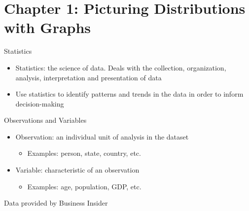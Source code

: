 \documentclass{beamer}
\begin{document}
\section{Chapter 1: Picturing Distributions with Graphs}

\begin{frame}{Statistics}
    \begin{itemize}
        \item \alert{Statistics}: the science of data. Deals with the collection, organization, analysis, interpretation and presentation of data
        \item Use statistics to identify patterns and trends in the data in order to inform decision-making
    \end{itemize}
\end{frame}

\begin{frame}{Observations and Variables}
    \begin{itemize}
        \item \alert{Observation}: an individual unit of analysis in the dataset
        \begin{itemize}
            \item Examples: person, state, country, etc.
        \end{itemize}
        
        \item \alert{Variable}: characteristic of an observation
        \begin{itemize}
            \item Examples: age, population, GDP, etc.
        \end{itemize}
    \end{itemize}

    \begin{center}
    \tiny{Data provided by Business Insider}
    \end{center}

\end{frame}
\end{document}

